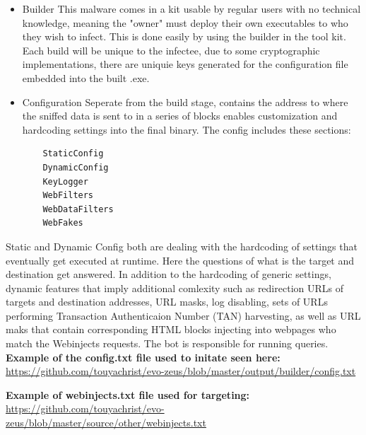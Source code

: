\documentclass[12pt, letterpaper]{article}
\begin{document}
\begin{sloppypar}
\begin{itemize}
\item
	Builder This malware comes in a kit usable by regular users with no
  	technical knowledge, meaning the "owner" must deploy their own
  	executables to who they wish to infect. This is done easily by using
  	the builder in the tool kit. Each build will be unique to the
  	infectee, due to some cryptographic implementations, there are uniquie
  	keys generated for the configuration file embedded into the built
  	.exe.
\item
  	Configuration Seperate from the build stage, contains the address to
  	where the sniffed data is sent to in a series of blocks enables
  	customization and hardcoding settings into the final binary. The
  	config includes these sections:
  	\begin{verbatim}
	StaticConfig 
	DynamicConfig
	KeyLogger
	WebFilters
	WebDataFilters
	WebFakes
	\end{verbatim}  
\end{itemize}

Static and Dynamic Config both are dealing with the hardcoding of
settings that eventually get executed at runtime. Here the questions of
what is the target and destination get answered. In addition to the
hardcoding of generic settings, dynamic features that imply additional
comlexity such as redirection URLs of targets and destination addresses,
URL masks, log disabling, sets of URLs performing Transaction
Authenticaion Number (TAN) harvesting, as well as URL maks that contain
corresponding HTML blocks injecting into webpages who match the
Webinjects requests. The bot is responsible for running queries. \\

\noindent \textbf {Example of the config.txt file used to initate seen here:} \\
\url {https://github.com/touyachrist/evo-zeus/blob/master/output/builder/config.txt}


\noindent \textbf {Example of webinjects.txt file used for targeting:} \\
\url {https://github.com/touyachrist/evo-zeus/blob/master/source/other/webinjects.txt}


\end{sloppypar}
\end{document}

